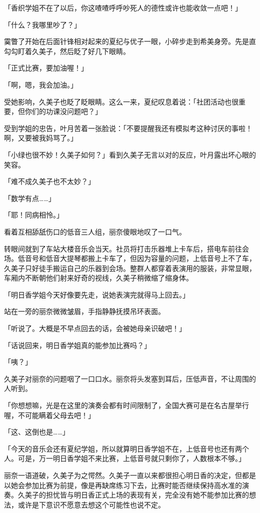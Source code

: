 \documentclass[UTF8]{ctexart}
\begin{document}
    「香织学姐不在了以后，你这喳喳呼呼吵死人的德性或许也能收敛一点吧！」 

    「什么？我哪里吵了？」 

    霙瞥了开始在后面针锋相对起来的夏纪与优子一眼，小碎步走到希美身旁。先是直勾勾盯着久美子，然后眨了好几下眼睛。 

    「正式比赛，要加油喔！」 

    「啊，嗯，我会加油。」 

    受她影响，久美子也眨了眨眼睛。这么一来，夏纪叹息着说：「社团活动也很重要，但你们的功课没问题吧？」 

    受到学姐的忠告，叶月苦着一张脸说：「不要提醒我还有模拟考这种讨厌的事啦！啊，又要被我妈骂了。」 

    「小绿也很不妙！久美子如何？」看到久美子无言以对的反应，叶月露出坏心眼的笑容。 

    「难不成久美子也不太妙？」 

    「数学有点……」 

    「耶！同病相怜。」 

    看着互相舔舐伤口的低音三人组，丽奈傻眼地叹了一口气。 

    转眼间就到了车站大楼音乐会当天。社员将打击乐器堆上卡车后，搭电车前往会场。低音号和低音大提琴都搬上卡车了，但因为容量的问题，上低音号上不了车，久美子只好徒手搬运自己的乐器到会场。整群人都穿着表演用的服装，非常显眼，车厢内不断朝他们射来好奇的视线，久美子稍微缩了缩身体。 

    「明日香学姐今天好像要先走，说她表演完就得马上回去。」 

    站在一旁的丽奈微微皱眉，手指静静抚摸吊环表面。 

    「听说了。大概是不早点回去的话，会被她母亲识破吧！」 

    「话说回来，明日香学姐真的能参加比赛吗？」 

    「咦？」 

    久美子对丽奈的问题咽了一口口水。丽奈将头发塞到耳后，压低声音，不让周围的人听到。 

    「你想想嘛，光是在这里的演奏会都有时间限制了，全国大赛可是在名古屋举行喔，不可能瞒着父母去吧！」 

    「这、这倒也是……」 

    「今天的音乐会还有夏纪学姐，所以就算明日香学姐不在，上低音号也还有两个人。可是，万一明日香学姐不来比赛，上低音号就只剩你了，人数根本不够。」 

    丽奈一语道破，久美子为之愕然。久美子一直以来都很担心明日香的决定，但都是以她会参加比赛为前提，像是再缺席练习下去，比赛时能否继续保持高水准的演奏。久美子的担忧皆与明日香正式上场的表现有关，完全没有她不能参加比赛的想法，或许是下意识不愿意去想这个可能性也说不定。 
\end{document}
